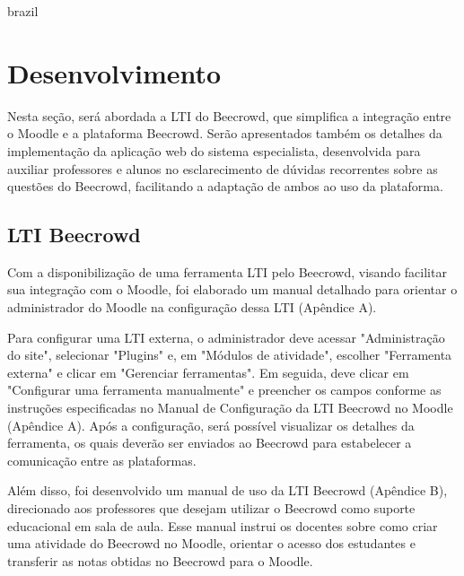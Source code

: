 

\begin{otherlanguage*}{brazil}

\chapter{Desenvolvimento}

Nesta seção, será abordada a LTI do Beecrowd, que simplifica a integração entre o Moodle e a plataforma Beecrowd. Serão apresentados também os detalhes da implementação da aplicação web do sistema especialista, desenvolvida para auxiliar professores e alunos no esclarecimento de dúvidas recorrentes sobre as questões do Beecrowd, facilitando a adaptação de ambos ao uso da plataforma.

\section{LTI Beecrowd}

Com a disponibilização de uma ferramenta LTI pelo Beecrowd, visando facilitar sua integração com o Moodle, foi elaborado um manual detalhado para orientar o administrador do Moodle na configuração dessa LTI (Apêndice A).

Para configurar uma LTI externa, o administrador deve acessar "Administração do site", selecionar "Plugins" e, em "Módulos de atividade", escolher "Ferramenta externa" e clicar em "Gerenciar ferramentas". Em seguida, deve clicar em "Configurar uma ferramenta manualmente" e preencher os campos conforme as instruções especificadas no Manual de Configuração da LTI Beecrowd no Moodle (Apêndice A). Após a configuração, será possível visualizar os detalhes da ferramenta, os quais deverão ser enviados ao Beecrowd para estabelecer a comunicação entre as plataformas.

Além disso, foi desenvolvido um manual de uso da LTI Beecrowd (Apêndice B), direcionado aos professores que desejam utilizar o Beecrowd como suporte educacional em sala de aula. Esse manual instrui os docentes sobre como criar uma atividade do Beecrowd no Moodle, orientar o acesso dos estudantes e transferir as notas obtidas no Beecrowd para o Moodle.


\end{otherlanguage*}
